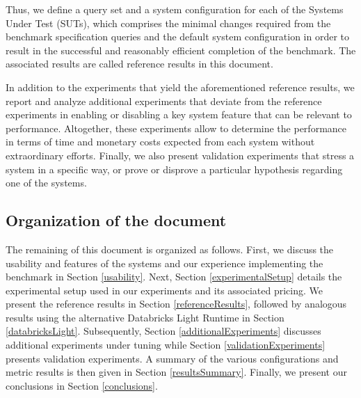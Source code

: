 Thus, we define a query set and a system configuration for each of the Systems Under Test (SUTs), which comprises the minimal changes required from the benchmark specification queries and the default system configuration in order to result in the successful and reasonably efficient completion of the benchmark. The associated results are called reference results in this document.

In addition to the experiments that yield the aforementioned reference results, we report and analyze additional experiments that deviate from the reference experiments in enabling or disabling a key system feature that can be relevant to performance. Altogether, these experiments allow to determine the performance in terms of time and monetary costs expected from each system without extraordinary efforts. Finally, we also present validation experiments that stress a system in a specific way, or prove or disprove a particular hypothesis regarding one of the systems.

\subsection{Organization of the document}
The remaining of this document is organized as follows. First, we discuss the usability and features of the systems and our experience implementing the benchmark in Section \ref{usability}. Next, Section \ref{experimentalSetup} details the experimental setup used in our experiments and its associated pricing. We present the reference results in Section \ref{referenceResults}, followed by analogous results using the alternative Databricks Light Runtime in Section \ref{databricksLight}. Subsequently, Section \ref{additionalExperiments} discusses additional experiments under tuning while Section \ref{validationExperiments} presents validation experiments. A summary of the various configurations and metric results is then given in Section \ref{resultsSummary}. Finally, we present our conclusions in Section \ref{conclusions}.


